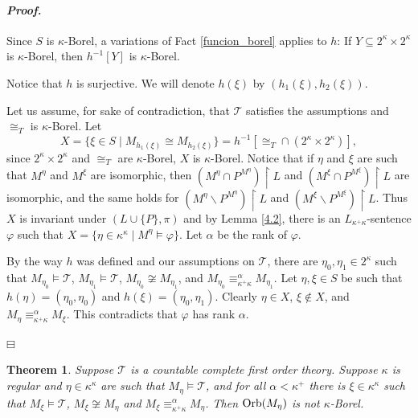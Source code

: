 \documentclass[12pt,a4paper]{amsart}
\newtheorem{thm}{Theorem}[section]
\theoremstyle{definition}
\theoremstyle{remark}
\renewcommand{\mid}{\mathrel{|}\allowbreak}
\renewcommand{\restriction}{\mathbin\upharpoonright}
\newenvironment{cproof}{\paragraph{\emph{Proof.\,}}}{\hfill{$\boxminus$}\par\vspace{2mm}}
\def\Orb{\mbox{\rm Orb}}
\begin{document}
\begin{cproof}
Since $S$ is $\kappa$-Borel, a variations of Fact \ref{funcion_borel} applies to $h$: If $Y\subseteq 2^\kappa\times 2^\kappa$ is $\kappa$-Borel, then $h^{-1}[Y]$ is $\kappa$-Borel.

Notice that $h$ is surjective. We will denote $h(\xi)$ by $(h_1(\xi),h_2(\xi))$.

Let us assume, for sake of contradiction, that $\mathcal{T}$ satisfies the assumptions and $\cong_T$ is $\kappa$-Borel.
Let $$X=\{\xi\in S\mid M_{h_1(\xi)}\cong M_{h_2(\xi)}\}=h^{-1}[\cong_T\cap(2^\kappa\times 2^\kappa)],$$ since $2^\kappa\times 2^\kappa$ and $\cong_T$ are $\kappa$-Borel, $X$ is $\kappa$-Borel. 
Notice that if $\eta$ and $\xi$ are such that $M^\eta$ and $M^\xi$ are isomorphic, then $(M^{\eta}\cap P^{M^{\eta}})\restriction L$ and $(M^{\xi}\cap P^{M^{\xi}})\restriction L$ are isomorphic, and the same holds for $(M^{\eta}\backslash P^{M^{\eta}})\restriction L$ and $(M^{\xi}\backslash P^{M^{\xi}})\restriction L$. 
Thus $X$ is invariant under $(L\cup\{P\},\pi)$ and by Lemma \ref{4.2}, there is an $L_{\kappa^+\kappa}$-sentence $\varphi$ such that $X=\{\eta\in \kappa^\kappa\mid M^\eta\models \varphi\}$. Let $\alpha$ be the rank of $\varphi$.

By the way $h$ was defined and our assumptions on $\mathcal{T}$, there are $\eta_0,\eta_1\in 2^\kappa$ such that $M_{\eta_0}\models \mathcal{T}$, $M_{\eta_1}\models \mathcal{T}$, $M_{\eta_0}\not\cong M_{\eta_1}$, and $M_{\eta_0}\equiv_{\kappa^+\kappa}^\alpha M_{\eta_1}$. Let $\eta,\xi\in S$ be such that $h(\eta)=(\eta_0,\eta_0)$ and $h(\xi)=(\eta_0,\eta_1)$. Clearly $\eta\in X$, $\xi\notin X$, and $M_{\eta}\equiv_{\kappa^+\kappa}^\alpha M_{\xi}$. This contradicts that $\varphi$ has rank $\alpha$.

    \end{cproof}

    

\begin{thm}Suppose $\mathcal{T}$ is a countable complete first order theory.
    Suppose $\kappa$ 
    is regular and $\eta\in \kappa^\kappa$ are such that $M_\eta\models \mathcal{T}$, and for all $\alpha<\kappa^+$ there is $\xi\in \kappa^\kappa$ such that $M_\xi\models \mathcal{T}$, $M_\xi \not\cong M_\eta$ and $M_\xi\equiv^\alpha_{\kappa^+\kappa} M_\eta$. Then $\Orb(M_\eta)$ is not $\kappa$-Borel. %
\end{thm}
\end{document}
